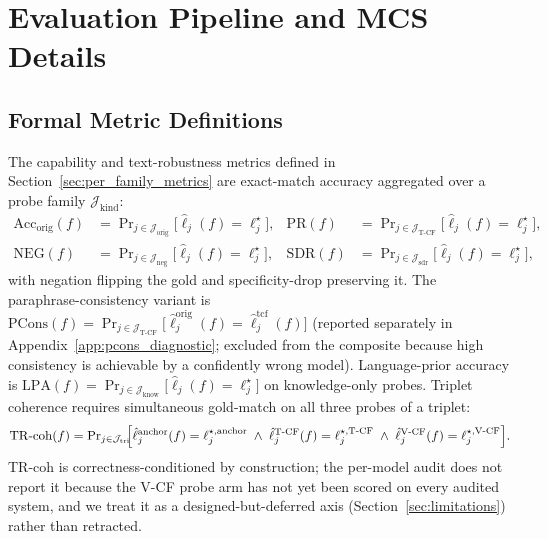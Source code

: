 \documentclass{article}
\begin{document}
\section{Evaluation Pipeline and MCS Details}
\label{app:eval_pipeline_detail}


\subsection{Formal Metric Definitions}
\label{app:metric_formulas}

The capability and text-robustness metrics defined in Section~\ref{sec:per_family_metrics} are exact-match accuracy aggregated over a probe family $\mathcal{J}_{\mathrm{kind}}$:
\begin{align}
  \mathrm{Acc}_{\mathrm{orig}}(f) &= \Pr\nolimits_{j\in\mathcal{J}_{\mathrm{orig}}}\!\!\bigl[\hat{\ell}_j(f)=\ell^{\star}_j\bigr], &
  \mathrm{PR}(f) &= \Pr\nolimits_{j\in\mathcal{J}_{\mathrm{T\text{-}CF}}}\!\!\bigl[\hat{\ell}_j(f)=\ell^{\star}_j\bigr], \nonumber\\
  \mathrm{NEG}(f) &= \Pr\nolimits_{j\in\mathcal{J}_{\mathrm{neg}}}\!\!\bigl[\hat{\ell}_j(f)=\ell^{\star}_j\bigr], &
  \mathrm{SDR}(f) &= \Pr\nolimits_{j\in\mathcal{J}_{\mathrm{sdr}}}\!\!\bigl[\hat{\ell}_j(f)=\ell^{\star}_j\bigr],
  \label{eq:cap_metrics}
\end{align}
with negation flipping the gold and specificity-drop preserving it. The paraphrase-consistency variant is $\mathrm{PCons}(f)=\Pr_{j\in\mathcal{J}_{\mathrm{T\text{-}CF}}}\!\bigl[\hat{\ell}^{\mathrm{orig}}_j(f)=\hat{\ell}^{\mathrm{tcf}}_j(f)\bigr]$ (reported separately in Appendix~\ref{app:pcons_diagnostic}; excluded from the composite because high consistency is achievable by a confidently wrong model). Language-prior accuracy is $\mathrm{LPA}(f)=\Pr_{j\in\mathcal{J}_{\mathrm{know}}}\!\bigl[\hat{\ell}_j(f)=\ell^{\star}_j\bigr]$ on knowledge-only probes. Triplet coherence requires simultaneous gold-match on all three probes of a triplet:
\begin{equation}
  \mathrm{TR\text{-}coh}(f) = \Pr\nolimits_{j\in\mathcal{J}_{\mathrm{tri}}}\!\!\Bigl[
    \hat{\ell}^{\mathrm{anchor}}_j(f)=\ell^{\star,\mathrm{anchor}}_j
    \;\wedge\;
    \hat{\ell}^{\mathrm{T\text{-}CF}}_j(f)=\ell^{\star,\mathrm{T\text{-}CF}}_j
    \;\wedge\;
    \hat{\ell}^{\mathrm{V\text{-}CF}}_j(f)=\ell^{\star,\mathrm{V\text{-}CF}}_j
  \Bigr].
  \label{eq:trcoh}
\end{equation}
TR-coh is correctness-conditioned by construction; the per-model audit does not report it because the V-CF probe arm has not yet been scored on every audited system, and we treat it as a designed-but-deferred axis (Section~\ref{sec:limitations}) rather than retracted.
\end{document}
